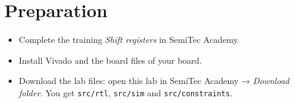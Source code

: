 \section{Preparation}
\begin{itemize}
  \item Complete the training \emph{Shift registers} in SemiTec Academy.
  \item Install Vivado and the board files of your board.
  \item Download the lab files: open this lab in SemiTec Academy → \emph{Download folder}.
        You get \texttt{src/rtl}, \texttt{src/sim} and \texttt{src/constraints}.
\end{itemize}
